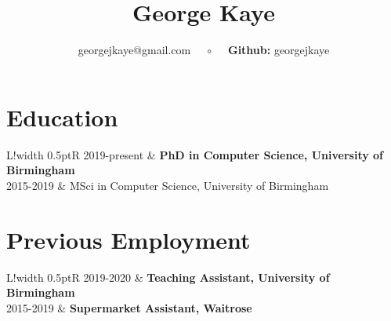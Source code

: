 \documentclass[10pt]{article}
\title{\Huge\textbf{George Kaye}}
\author{georgejkaye@gmail.com $\quad\circ\quad$ \textbf{Github:} georgejkaye}
\date{}
\newcommand\VRule{\color{lightgray}\vrule width 0.5pt}
\begin{document}
\maketitle

\section*{Education}

\begin{tabular}{L!{\VRule}R}
    2019-present & \textbf{PhD in Computer Science, University of Birmingham} \\
    2015-2019 & MSci in Computer Science, University of Birmingham
\end{tabular}

\section*{Previous Employment}

\begin{tabular}{L!{\VRule}R}
    2019-2020 & \textbf{Teaching Assistant, University of Birmingham} \\
    2015-2019 & \textbf{Supermarket Assistant, Waitrose}
\end{tabular}
\end{document}
